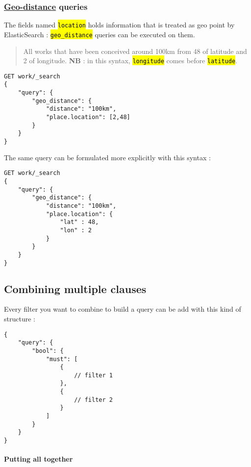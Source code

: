 \documentclass[a4paper,12pt]{article}
\let\OldTexttt\texttt
\renewcommand{\texttt}[1]{\OldTexttt{\hl{#1}}}
\begin{document}
\subsubsection{\href{https://www.elastic.co/guide/en/elasticsearch/reference/current/query-dsl-geo-distance-query.html}{Geo-distance} queries}\label{geo-distance-queries}

The fields named \texttt{location} holds information that is treated as geo point by ElasticSearch : \texttt{geo\_distance} queries can be executed on them.

\begin{quote}
All works that have been conceived around 100km from 48 of latitude and 2 of longitude. \textbf{NB} : in this syntax, \texttt{longitude} comes before \texttt{latitude}.
\end{quote}

\begin{lstlisting}
GET work/_search
{
    "query": {
        "geo_distance": {
            "distance": "100km",
            "place.location": [2,48]
        }
    }
}
\end{lstlisting}

The same query can be formulated more explicitly with this syntax :

\begin{lstlisting}
GET work/_search
{
    "query": {
        "geo_distance": {
            "distance": "100km",
            "place.location": {
                "lat" : 48,
                "lon" : 2
            }
        }
    }
}
\end{lstlisting}

\subsection{Combining multiple clauses}\label{combining-multiple-clauses}

Every filter you want to combine to build a query can be add with this kind of structure :

\begin{lstlisting}
{
    "query": {
        "bool": {
            "must": [
                {
                    // filter 1
                },
                {
                    // filter 2
                }
            ]
        }
    }
}
\end{lstlisting}

\paragraph{Putting all together}\label{putting-all-together}
\end{document}
